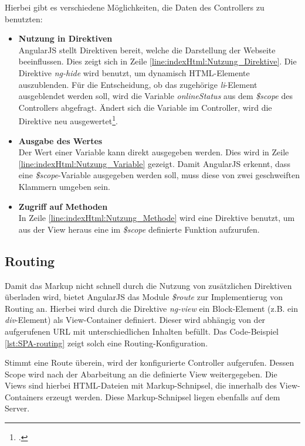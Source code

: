 Hierbei gibt es verschiedene Möglichkeiten, die Daten des Controllers zu benutzten: 
\begin{itemize}
\item \textbf{Nutzung in Direktiven}\\
AngularJS stellt Direktiven bereit, welche die Darstellung der Webseite beeinflussen. Dies zeigt sich in Zeile \ref{line:indexHtml:Nutzung_Direktive}. Die Direktive \textit{ng-hide} wird benutzt, um dynamisch \ac{HTML}-Elemente auszublenden. Für die Entscheidung, ob das zugehörige \textit{li}-Element ausgeblendet werden soll, wird die Variable \textit{onlineStatus} aus dem \textit{\$scope} des Controllers abgefragt. Ändert sich die Variable im Controller, wird die Direktive neu ausgewertet\footcite{online:angular:diretive}.
\item \textbf{Ausgabe des Wertes}\\
Der Wert einer Variable kann direkt ausgegeben werden. Dies wird in Zeile \ref{line:indexHtml:Nutzung_Variable} gezeigt. Damit AngularJS erkennt, dass eine \textit{\$scope}-Variable ausgegeben werden soll, muss diese von zwei geschweiften Klammern umgeben sein.
\item \textbf{Zugriff auf Methoden}\\
In Zeile \ref{line:indexHtml:Nutzung_Methode} wird eine Direktive benutzt, um aus der View heraus eine im \textit{\$scope} definierte Funktion aufzurufen.
\end{itemize}
\subsection{Routing}
\label{ssec:SPA-Routing}
Damit das \gls{Markup} nicht schnell durch die Nutzung von zusätzlichen Direktiven überladen wird, bietet AngularJS das Module \textit{\$route} zur Implementierug von Routing an. Hierbei wird durch die Direktive \textit{ng-view} ein Block-Element (z.B. ein \textit{div}-Element) als View-Container definiert. Dieser wird abhängig von der aufgerufenen URL mit unterschiedlichen Inhalten befüllt. Das Code-Beispiel \ref{lst:SPA-routing} zeigt solch eine Routing-Konfiguration. 

Stimmt eine Route überein, wird der konfigurierte Controller aufgerufen. Dessen Scope wird nach der Abarbeitung an die definierte View weitergegeben. Die Views sind hierbei \ac{HTML}-Dateien mit \gls{Markup}-Schnipsel, die innerhalb des View-Containers erzeugt werden. Diese \gls{Markup}-Schnipsel liegen ebenfalls auf dem Server. 

